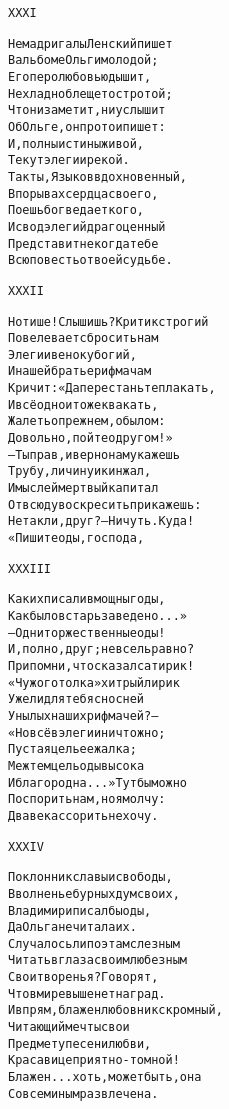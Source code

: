 \begin{minipage}[t]{\dimexpr 0.5\textwidth -\tabcolsep-.5pt}
\begin{alltt}\normalfont\centering
XXXI

Не мадригалы Ленский пишет
В альбоме Ольги молодой;
Его перо любовью дышит,
Не хладно блещет остротой;
Что ни заметит, ни услышит
Об Ольге, он про то и пишет:
И, полны истины живой,
Текут элегии рекой.
Так ты, Языков вдохновенный,
В порывах сердца своего,
Поешь бог ведает кого,
И свод элегий драгоценный
Представит некогда тебе
Всю повесть о твоей судьбе.
\end{alltt}
\end{minipage}

\begin{minipage}[t]{\dimexpr 0.5\textwidth -\tabcolsep-.5pt}
\begin{alltt}\normalfont\centering
XXXII

Но тише! Слышишь? Критик строгий
Повелевает сбросить нам
Элегии венок убогий,
И нашей братье рифмачам
Кричит: «Да перестаньте плакать,
И всё одно и то же квакать,
Жалеть о прежнем, о былом:
Довольно, пойте о другом!»
— Ты прав, и верно нам укажешь
Трубу, личину и кинжал,
И мыслей мертвый капитал
Отвсюду воскресить прикажешь:
Не так ли, друг? — Ничуть. Куда!
«Пишите оды, господа,
\end{alltt}
\end{minipage}
\clearpage

\begin{minipage}[t]{\dimexpr 0.5\textwidth -\tabcolsep-.5pt}
\begin{alltt}\normalfont\centering
XXXIII

Как их писали в мощны годы,
Как было встарь заведено...»
— Одни торжественные оды!
И, полно, друг; не все ль равно?
Припомни, что сказал сатирик!
«Чужого толка» хитрый лирик
Ужели для тебя сносней
Унылых наших рифмачей? —
«Но всё в элегии ничтожно;
Пустая цель ее жалка;
Меж тем цель оды высока
И благородна...» Тут бы можно
Поспорить нам, но я молчу:
Два века ссорить не хочу.
\end{alltt}
\end{minipage}

\begin{minipage}[t]{\dimexpr 0.5\textwidth -\tabcolsep-.5pt}
\begin{alltt}\normalfont\centering
XXXIV

Поклонник славы и свободы,
В волненье бурных дум своих,
Владимир и писал бы оды,
Да Ольга не читала их.
Случалось ли поэтам слезным
Читать в глаза своим любезным
Свои творенья? Говорят,
Что в мире выше нет наград.
И впрям, блажен любовник скромный,
Читающий мечты свои
Предмету песен и любви,
Красавице приятно-томной!
Блажен... хоть, может быть, она
Совсем иным развлечена.
\end{alltt}
\end{minipage}
\clearpage

